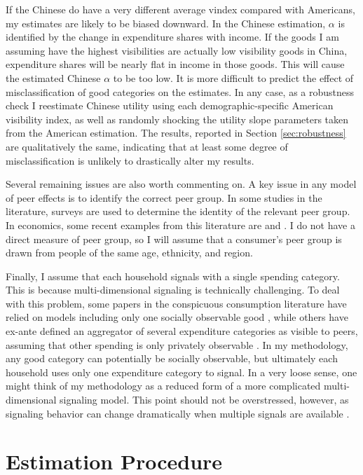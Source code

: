 \documentclass[11pt]{article}
\begin{document}
\begin{CJK}{UTF8}{gbsn}
If the Chinese do have a very different average vindex compared with Americans, my estimates are likely to be biased downward.  In the Chinese estimation, $\alpha$ is identified by the change in expenditure shares with income.  If the goods I am assuming have the highest visibilities are actually low visibility goods in China, expenditure shares will be nearly flat in income in those goods.  This will cause the estimated Chinese $\alpha$ to be too low.  It is more difficult to predict the effect of misclassification of good categories on the estimates.  In any case, as a robustness check I reestimate Chinese utility using each demographic-specific American visibility index, as well as randomly shocking the utility slope parameters taken from the American estimation.  The results, reported in Section \ref{sec:robustness} are qualitatively the same, indicating that at least some degree of misclassification is unlikely to drastically alter my results.

Several remaining issues are also worth commenting on.  A key issue in any model of peer effects is to identify the correct peer group.  In some studies in the literature, surveys are used to determine the identity of the relevant peer group.  In economics, some recent examples from this literature are \citet{conley2010learning} and \citet{christakis2010empirical}.  I do not have a direct measure of peer group, so I will assume that a consumer's peer group is drawn from people of the same age, ethnicity, and region.  

Finally, I assume that each household signals with a single spending category.  This is because multi-dimensional signaling is technically challenging.  To deal with this problem, some papers in the conspicuous consumption literature have relied on models including only one socially observable good \citep{heffetz2011}, while others have ex-ante defined an aggregator of several expenditure categories as visible to peers, assuming that other spending is only privately observable \citep{Charlesetal2009,perez2013measuring}.  In my methodology, any good category can potentially be socially observable, but ultimately each household uses only one expenditure category to signal.  In a very loose sense, one might think of my methodology as a reduced form of a more complicated multi-dimensional signaling model. This point should not be overstressed, however, as signaling behavior can change dramatically when multiple signals are available \citep{matthews1987monopoly}.

\section{Estimation Procedure} 


\end{CJK}
\end{document}
